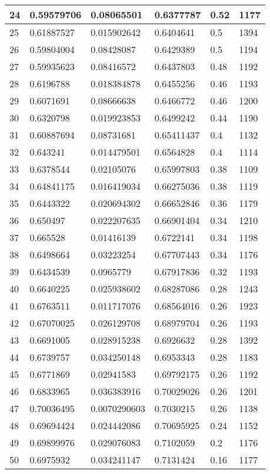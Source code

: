 \begin{longtable}{|l|l|l|l|l|l|}
24 & 0.59579706 & 0.08065501 & 0.6377787 & 0.52 & 1177 \\ \hline 
25 & 0.61887527 & 0.015902642 & 0.6404641 & 0.5 & 1394 \\ \hline 
26 & 0.59804004 & 0.08428087 & 0.6429389 & 0.5 & 1194 \\ \hline 
27 & 0.59935623 & 0.08416572 & 0.6437803 & 0.48 & 1192 \\ \hline 
28 & 0.6196788 & 0.018384878 & 0.6455256 & 0.46 & 1193 \\ \hline 
29 & 0.6071691 & 0.08666638 & 0.6466772 & 0.46 & 1200 \\ \hline 
30 & 0.6320798 & 0.019923853 & 0.6499242 & 0.44 & 1190 \\ \hline 
31 & 0.60887694 & 0.08731681 & 0.65411437 & 0.4 & 1132 \\ \hline 
32 & 0.643241 & 0.014479501 & 0.6564828 & 0.4 & 1114 \\ \hline 
33 & 0.6378544 & 0.02105076 & 0.65997803 & 0.38 & 1109 \\ \hline 
34 & 0.64841175 & 0.016419034 & 0.66275036 & 0.38 & 1119 \\ \hline 
35 & 0.6443322 & 0.020694302 & 0.66652846 & 0.36 & 1179 \\ \hline 
36 & 0.650497 & 0.022207635 & 0.66901404 & 0.34 & 1210 \\ \hline 
37 & 0.665528 & 0.01416139 & 0.6722141 & 0.34 & 1198 \\ \hline 
38 & 0.6498664 & 0.03223254 & 0.67707443 & 0.34 & 1176 \\ \hline 
39 & 0.6434539 & 0.0965779 & 0.67917836 & 0.32 & 1193 \\ \hline 
40 & 0.6640225 & 0.025938602 & 0.68287086 & 0.28 & 1243 \\ \hline 
41 & 0.6763511 & 0.011717076 & 0.68564016 & 0.26 & 1923 \\ \hline 
42 & 0.67070025 & 0.026129708 & 0.68979704 & 0.26 & 1193 \\ \hline 
43 & 0.6691005 & 0.028915238 & 0.6926632 & 0.28 & 1392 \\ \hline 
44 & 0.6739757 & 0.034250148 & 0.6953343 & 0.28 & 1183 \\ \hline 
45 & 0.6771869 & 0.02941583 & 0.69792175 & 0.26 & 1192 \\ \hline 
46 & 0.6833965 & 0.036383916 & 0.70029026 & 0.26 & 1201 \\ \hline 
47 & 0.70036495 & 0.0070290603 & 0.7030215 & 0.26 & 1138 \\ \hline 
48 & 0.69694424 & 0.024442086 & 0.70695925 & 0.24 & 1152 \\ \hline 
49 & 0.69899976 & 0.029076083 & 0.7102059 & 0.2 & 1176 \\ \hline 
50 & 0.6975932 & 0.034241147 & 0.7131424 & 0.16 & 1177 \\ \hline 
\end{longtable}